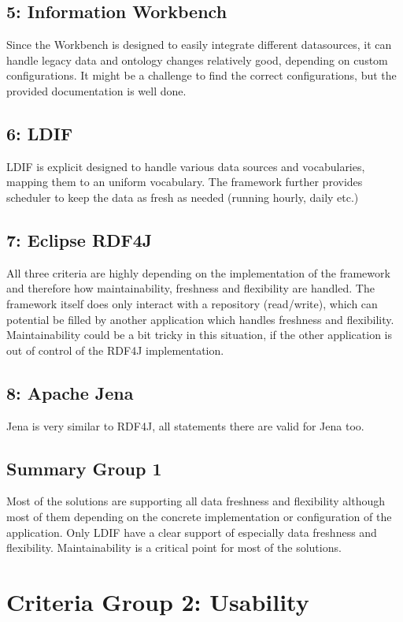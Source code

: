 \subsection*{5: Information Workbench}
Since the Workbench is designed to easily integrate different datasources, it can handle legacy data and ontology changes relatively good, depending on custom configurations. It might be a challenge to find the correct configurations, but the provided documentation is well done.

\subsection*{6: LDIF}
LDIF is explicit designed to handle various data sources and vocabularies, mapping them to an uniform vocabulary. The framework further provides scheduler to keep the data as fresh as needed (running hourly, daily etc.)

\subsection*{7: Eclipse RDF4J}
All three criteria are highly depending on the implementation of the framework and therefore how maintainability, freshness and flexibility are handled. The framework itself does only interact with a repository (read/write), which can potential be filled by another application which handles freshness and flexibility. Maintainability could be a bit tricky in this situation, if the other application is out of control of the RDF4J implementation.

\subsection*{8: Apache Jena}
Jena is very similar to RDF4J, all statements there are valid for Jena too.

\subsection{Summary Group 1}
Most of the solutions are supporting all data freshness and flexibility although most of them depending on the concrete implementation or configuration of the application. Only LDIF have a clear support of especially data freshness and flexibility. Maintainability is a critical point for most of the solutions.

\section{Criteria Group 2: Usability}

